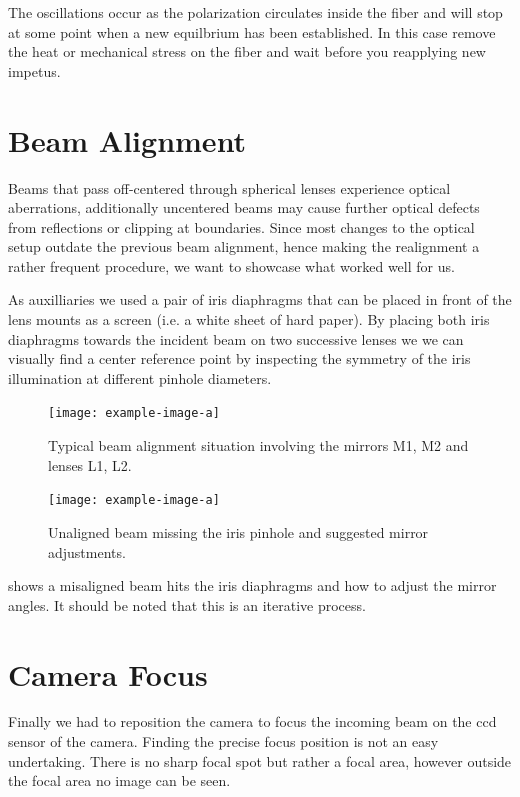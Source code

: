 The oscillations occur as the polarization circulates inside the fiber and
will stop at some point when a new equilbrium has been established. In this
case remove the heat or mechanical stress on the fiber and wait before you
reapplying new impetus.

\section{Beam Alignment}

Beams that pass off-centered through spherical lenses experience optical
aberrations, additionally uncentered beams may cause further optical defects
from reflections or clipping at boundaries. Since most changes to the optical
setup outdate the previous beam alignment, hence making the realignment
a rather frequent procedure, we want to showcase what worked well for us.

As auxilliaries we used a pair of iris diaphragms that can be placed in front
of the lens mounts as a screen (i.e. a white sheet of hard paper). By placing
both iris diaphragms towards the incident beam on two successive lenses we
we can visually find a center reference point by inspecting the symmetry of
the iris illumination at different pinhole diameters.

\begin{figure}[h]
  \centering
    \texttt{[image: example-image-a]}
    \caption{Typical beam alignment situation involving the mirrors M1, M2 and
    lenses L1, L2.}
    \label{fig:beamalign:setup}
  \endminipage
  \hfill
    \texttt{[image: example-image-a]}
    \caption{Unaligned beam missing the iris pinhole and suggested mirror
    adjustments.}
    \label{fig:beamalign:iris}
  \endminipage
  \hfill
\end{figure}

 shows a misaligned beam hits the iris diaphragms
and how to adjust the mirror angles. It should be noted that this is an
iterative process.

\section{Camera Focus}

Finally we had to reposition the camera to focus the incoming beam on the
\gls{ccd} sensor of the camera. Finding the precise focus position is not an
easy undertaking. There is no sharp focal spot but rather a focal area,
however outside the focal area no image can be seen.

